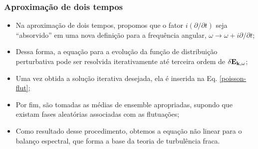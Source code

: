 \documentclass[10pt,aspectratio=1610,lualatex]{beamer}
\begin{document}
\begin{frame}
  \frametitle{Aproximação de dois tempos}
  \begin{itemize}
      \item Na aproximação de dois tempos, propomos que o fator
      $i(\partial/\partial t)$ seja ``absorvido'' em uma nova
      definição para a frequência angular, $\omega \rightarrow
      \omega+i \partial/\partial t$;
      \vspace{0.25cm}
      \pause
      \item Dessa forma, a equação para a evolução da função de
      distribuição perturbativa pode ser resolvida iterativamente
      até terceira ordem de $\delta {\bf E}_{{\bf k},\omega}$;
      \vspace{0.25cm}
      \pause
      \item Uma vez obtida a solução iterativa desejada, ela é
      inserida na Eq. \eqref{poisson-flut};
      \vspace{0.25cm}
      \pause
      \item Por fim, são tomadas as médias de ensemble apropriadas,
      supondo que existam fases aleatórias associadas com as flutuações;
      \vspace{0.25cm}
      \pause
      \item Como resultado desse procedimento, obtemos a equação não
      linear para o balanço espectral, que forma a base da teoria de
      turbulência fraca.
  \end{itemize}
\end{frame}
\end{document}
